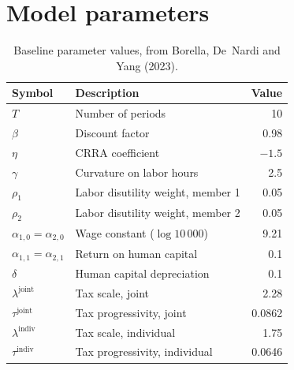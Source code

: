 \section*{Model parameters}

\begin{table}[h]
\centering
\begin{tabular}{l l r}
\hline
\textbf{Symbol} & \textbf{Description} & \textbf{Value} \\
\hline
$T$                          & Number of periods                    & 10 \\
$\beta$                      & Discount factor                      & 0.98 \\
$\eta$                       & CRRA coefficient                     & $-1.5$ \\
$\gamma$                     & Curvature on labor hours              & 2.5 \\
$\rho_1$                     & Labor disutility weight, member 1     & 0.05 \\
$\rho_2$                     & Labor disutility weight, member 2     & 0.05 \\
$\alpha_{1,0}=\alpha_{2,0}$  & Wage constant ($\log 10\,000$)       & 9.21 \\
$\alpha_{1,1}=\alpha_{2,1}$  & Return on human capital               & 0.1 \\
$\delta$                     & Human capital depreciation            & 0.1 \\
$\lambda^{\text{joint}}$     & Tax scale, joint                      & 2.28 \\
$\tau^{\text{joint}}$        & Tax progressivity, joint              & 0.0862 \\
$\lambda^{\text{indiv}}$     & Tax scale, individual                 & 1.75 \\
$\tau^{\text{indiv}}$        & Tax progressivity, individual         & 0.0646 \\
\hline
\end{tabular}
\caption{Baseline parameter values, from Borella, De~Nardi and Yang (2023).}
\label{tab:Model Parameters}
\end{table}
